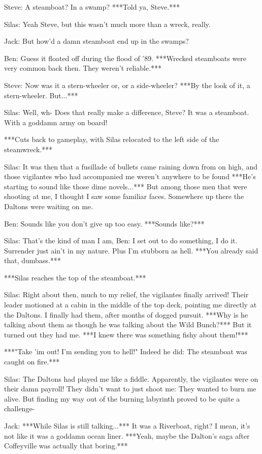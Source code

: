 \documentclass{article}
\begin{document}
Steve: A steamboat? In a swamp? ***Told ya, Steve.***

Silas: Yeah Steve, but this wasn't much more than a wreck, really.

Jack: But how'd a damn steamboat end up in the swamps?

Ben: Guess it floated off during the flood of '89. ***Wrecked steamboats were very common back then. They weren't reliable.***

Steve: Now was it a stern-wheeler or, or a side-wheeler? ***By the look of it, a stern-wheeler. But...***

Silas: Well, wh- Does that really make a difference, Steve? It was a steamboat. With a goddamn army on board!

***Cuts back to gameplay, with Silas relocated to the left side of the steamwreck.***

Silas: It was then that a fusillade of bullets came raining down from on high, and those vigilantes who had accompanied me weren't anywhere to be found ***He's starting to sound like those dime novels...*** But among those men that were shooting at me, I thought I saw some familiar faces. Somewhere up there the Daltons were waiting on me.

Ben: Sounds like you don't give up too easy. ***Sounds like?***

Silas: That's the kind of man I am, Ben: I set out to do something, I do it. Surrender just ain't in my nature. Plus I'm stubborn as hell. ***You already said that, dumbass.***

***Silas reaches the top of the steamboat.***

Silas: Right about then, much to my relief, the vigilantes finally arrived! Their leader motioned at a cabin in the middle of the top deck, pointing me directly at the Daltons. I finally had them, after months of dogged pursuit. ***Why is he talking about them as though he was talking about the Wild Bunch?*** But it turned out they had me. ***I knew there was something fishy about them!***

***"Take 'im out! I'm sending you to hell!" Indeed he did: The steamboat was caught on fire.***

Silas: The Daltons had played me like a fiddle. Apparently, the vigilantes were on their damn payroll! They didn't want to just shoot me: They wanted to burn me alive. But finding my way out of the burning labyrinth proved to be quite a challenge-

Jack: ***While Silas is still talking...*** It was a Riverboat, right? I mean, it's not like it was a goddamn ocean liner. ***Yeah, maybe the Dalton's saga after Coffeyville was actually that boring.***
\end{document}
